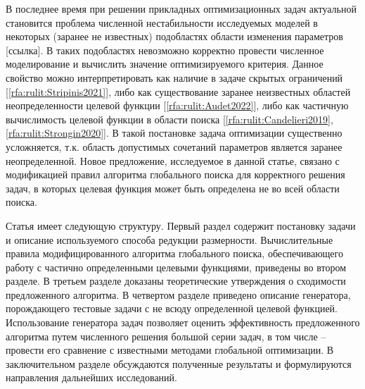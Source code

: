\documentclass[10pt,a4paper]{book}
\begin{document}
В последнее время при решении прикладных оптимизационных задач актуальной становится проблема численной нестабильности исследуемых моделей в некоторых (заранее не известных) подобластях области изменения параметров [\colorbox[rgb]{1,1,0}{ссылка}].
В таких подобластях невозможно корректно провести численное моделирование и вычислить значение оптимизируемого критерия.
Данное свойство можно интерпретировать как наличие в задаче скрытых ограничений [\ref{rfa:rulit:Stripinis2021}], либо как существование  заранее неизвестных областей неопределенности целевой функции [\ref{rfa:rulit:Audet2022}], либо как частичную вычислимость целевой функции в области поиска [\ref{rfa:rulit:Candelieri2019},\ref{rfa:rulit:Strongin2020}]. В такой постановке задача оптимизации существенно усложняется, т.к. область допустимых сочетаний параметров является заранее неопределенной. Новое предложение, исследуемое в данной статье, связано с модификацией правил алгоритма глобального поиска для корректного решения задач, в которых целевая функция может быть определена не во всей области поиска.

Статья имеет следующую структуру. Первый раздел содержит постановку задачи и описание используемого способа редукции размерности. Вычислительные правила модифицированного алгоритма глобального поиска, обеспечивающего работу с частично определенными целевыми функциями, приведены во втором разделе. В третьем разделе доказаны теоретические утверждения о сходимости предложенного алгоритма. В четвертом разделе приведено описание генератора, порождающего тестовые задачи с не всюду определенной целевой функцией. Использование генератора задач позволяет оценить эффективность предложенного алгоритма путем численного решения большой серии задач, в том числе -- провести его сравнение с известными методами глобальной оптимизации. В заключительном разделе обсуждаются полученные результаты и формулируются направления дальнейших исследований.
\end{document}
